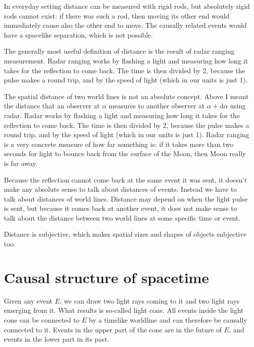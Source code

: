 \documentclass[11pt,oneside%
]{memoir}
\newcommand{\dd}{\mathrm{d}}
\begin{document}
In everyday setting distance can be measured with rigid rods, but absolutely rigid rods cannot exist: if there was such a rod, then moving its other end would immediately cause also the other end to move. The causally related events would have a spacelike separation, which is not possible.

The generally most useful definition of distance is the result of radar ranging measurement. Radar ranging works by flashing a light and measuring how long it takes for the reflection to come back. The time is then divided by 2, because the pulse makes a round trip, and by the speed of light (which in our units is just 1).

The spatial distance of two world lines is not an absolute concept. Above I meant the distance that an observer at \(\alpha\) measures to another observer at \(\alpha+\dd\alpha\) using radar. Radar works by flashing a light and measuring how long it takes for the reflection to come back. The time is then divided by 2, because the pulse makes a round trip, and by the speed of light (which in our units is just 1). Radar ranging is a very concrete measure of how far something is: if it takes more than two seconds for light to bounce back from the surface of the Moon, then Moon really is far away.

Because the reflection cannot come back at the same event it was sent, it doesn't make any absolute sense to talk about distances of events. Instead we have to talk about distances of world lines. Distance may depend on when the light pulse is sent, but because it comes back at another event, it does not make sense to talk about the distance between two world lines at some specific time or event.

Distance is subjective, which makes spatial sizes and shapes of objects subjective too.

\section{Causal structure of spacetime}

Given any event \(E\), we can draw two light rays coming to it and two light rays emerging from it. What results is so-called light cone. All events inside the light cone can be connected to \(E\) by a timelike worldline and can therefore be causally connected to it. Events in the upper part of the cone are in the future of \(E\), and events in the lower part in its past.

\end{document}
